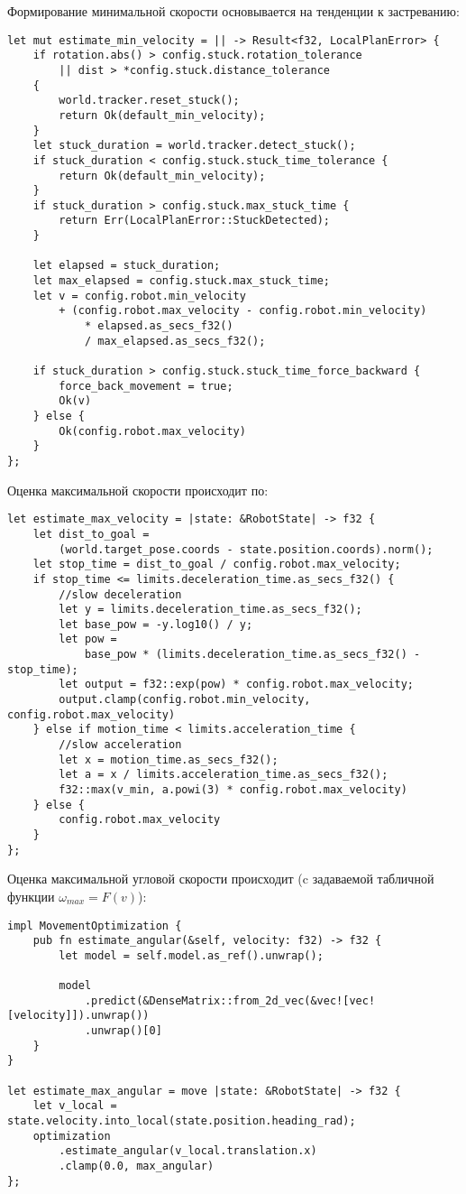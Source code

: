 Формирование минимальной скорости основывается
на тенденции к застреванию:
\begin{lstlisting}
let mut estimate_min_velocity = || -> Result<f32, LocalPlanError> {
    if rotation.abs() > config.stuck.rotation_tolerance
        || dist > *config.stuck.distance_tolerance
    {
        world.tracker.reset_stuck();
        return Ok(default_min_velocity);
    }
    let stuck_duration = world.tracker.detect_stuck();
    if stuck_duration < config.stuck.stuck_time_tolerance {
        return Ok(default_min_velocity);
    }
    if stuck_duration > config.stuck.max_stuck_time {
        return Err(LocalPlanError::StuckDetected);
    }

    let elapsed = stuck_duration;
    let max_elapsed = config.stuck.max_stuck_time;
    let v = config.robot.min_velocity
        + (config.robot.max_velocity - config.robot.min_velocity)
            * elapsed.as_secs_f32()
            / max_elapsed.as_secs_f32();

    if stuck_duration > config.stuck.stuck_time_force_backward {
        force_back_movement = true;
        Ok(v)
    } else {
        Ok(config.robot.max_velocity)
    }
};

\end{lstlisting}

Оценка максимальной скорости происходит по:
\begin{lstlisting}
let estimate_max_velocity = |state: &RobotState| -> f32 {
    let dist_to_goal =
        (world.target_pose.coords - state.position.coords).norm();
    let stop_time = dist_to_goal / config.robot.max_velocity;
    if stop_time <= limits.deceleration_time.as_secs_f32() {
        //slow deceleration
        let y = limits.deceleration_time.as_secs_f32();
        let base_pow = -y.log10() / y;
        let pow =
            base_pow * (limits.deceleration_time.as_secs_f32() - stop_time);
        let output = f32::exp(pow) * config.robot.max_velocity;
        output.clamp(config.robot.min_velocity, config.robot.max_velocity)
    } else if motion_time < limits.acceleration_time {
        //slow acceleration
        let x = motion_time.as_secs_f32();
        let a = x / limits.acceleration_time.as_secs_f32();
        f32::max(v_min, a.powi(3) * config.robot.max_velocity)
    } else {
        config.robot.max_velocity
    }
};
\end{lstlisting}

Оценка максимальной угловой скорости происходит (c задаваемой табличной функции $\omega_{max} = F(v)$):
\begin{lstlisting}
impl MovementOptimization {
    pub fn estimate_angular(&self, velocity: f32) -> f32 {
        let model = self.model.as_ref().unwrap();

        model
            .predict(&DenseMatrix::from_2d_vec(&vec![vec![velocity]]).unwrap())
            .unwrap()[0]
    }
}

let estimate_max_angular = move |state: &RobotState| -> f32 {
    let v_local = state.velocity.into_local(state.position.heading_rad);
    optimization
        .estimate_angular(v_local.translation.x)
        .clamp(0.0, max_angular)
};
\end{lstlisting}

